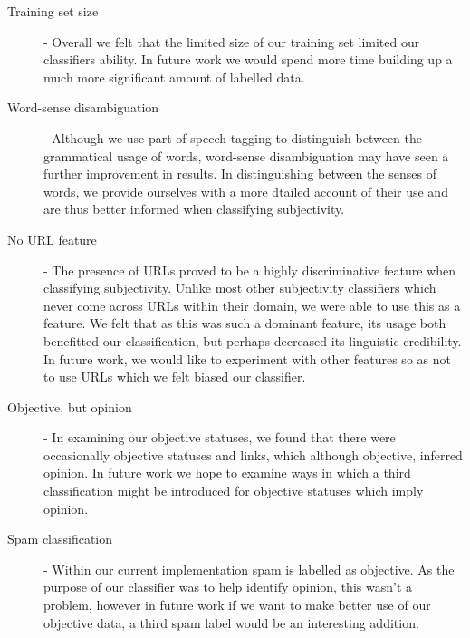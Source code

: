 \begin{description}
	\item [Training set size] - Overall we felt that the limited size of our training set limited our classifiers ability. In future work we would spend more time building up a much more significant amount of labelled data.
	\item [Word-sense disambiguation] - Although we use part-of-speech tagging to distinguish between the grammatical usage of words, word-sense disambiguation may have seen a further improvement in results. In distinguishing between the senses of words, we provide ourselves with a more dtailed account of their use and are thus better informed when classifying subjectivity.
	\item [No URL feature] - The presence of URLs proved to be a highly discriminative feature when classifying subjectivity. Unlike most other subjectivity classifiers which never come across URLs within their domain, we were able to use this as a feature. We felt that as this was such a dominant feature, its usage both benefitted our classification, but perhaps decreased its linguistic credibility. In future work, we would like to experiment with other features so as not to use URLs which we felt biased our classifier.
	\item [Objective, but opinion] - In examining our objective statuses, we found that there were occasionally objective statuses and links, which although objective, inferred opinion. In future work we hope to examine ways in which a third classification might be introduced for objective statuses which imply opinion.
	\item [Spam classification] - Within our current implementation spam is labelled as objective. As the purpose of our classifier was to help identify opinion, this wasn't a problem, however in future work if we want to make better use of our objective data, a third spam label would be an interesting addition.
\end{description}


